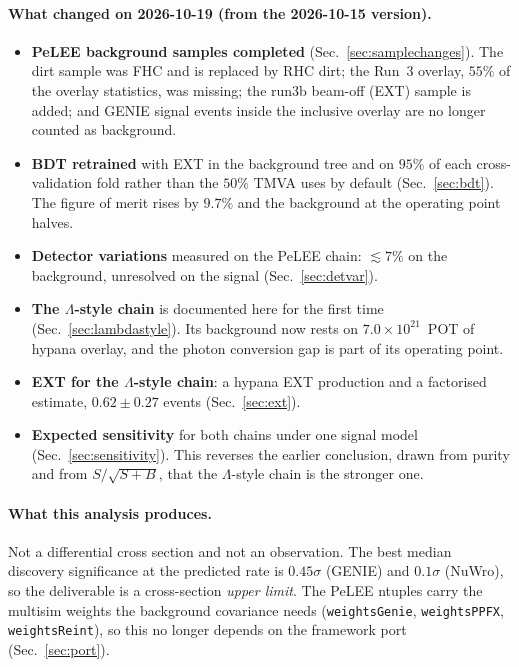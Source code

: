 \documentclass[11pt,a4paper]{article}
\newcommand{\Lam}{\ensuremath{\Lambda}}
\begin{document}
\paragraph{What changed on 2026-10-19 (from the 2026-10-15 version).}
\begin{itemize}
  \item \textbf{PeLEE background samples completed} (Sec.~\ref{sec:samplechanges}).
        The dirt sample was FHC and is replaced by RHC dirt; the Run~3 overlay, $55\%$
        of the overlay statistics, was missing; the run3b beam-off (EXT) sample is
        added; and GENIE signal events inside the inclusive overlay are no longer
        counted as background.
  \item \textbf{BDT retrained} with EXT in the background tree and on $95\%$ of each
        cross-validation fold rather than the $50\%$ TMVA uses by default
        (Sec.~\ref{sec:bdt}). The figure of merit rises by $9.7\%$ and the background
        at the operating point halves.
  \item \textbf{Detector variations} measured on the PeLEE chain: $\lesssim7\%$ on
        the background, unresolved on the signal (Sec.~\ref{sec:detvar}).
  \item \textbf{The \Lam-style chain} is documented here for the first time
        (Sec.~\ref{sec:lambdastyle}). Its background now rests on $7.0\times10^{21}$~POT
        of hypana overlay, and the photon conversion gap is part of its operating point.
  \item \textbf{EXT for the \Lam-style chain}: a hypana EXT production and a
        factorised estimate, $0.62\pm0.27$ events (Sec.~\ref{sec:ext}).
  \item \textbf{Expected sensitivity} for both chains under one signal model
        (Sec.~\ref{sec:sensitivity}). This reverses the earlier conclusion, drawn
        from purity and from $S/\sqrt{S+B}$, that the \Lam-style chain is the
        stronger one.
\end{itemize}

\paragraph{What this analysis produces.} Not a differential cross section and not
an observation. The best median discovery significance at the predicted rate is
$0.45\sigma$ (GENIE) and $0.1\sigma$ (NuWro), so the deliverable is a cross-section
\emph{upper limit}. The PeLEE ntuples carry the multisim weights the background
covariance needs (\texttt{weightsGenie}, \texttt{weightsPPFX},
\texttt{weightsReint}), so this no longer depends on the framework port
(Sec.~\ref{sec:port}).
\end{document}
